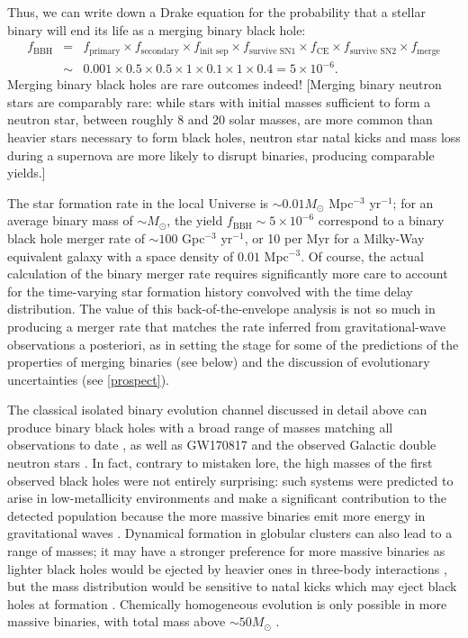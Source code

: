 \documentclass[iop,onecolumn]{revtex4}
\begin{document}
Thus, we can write down a Drake equation for the probability that a stellar binary will end its life as a merging binary black hole:
\begin{eqnarray}
f_\textrm{BBH} &=& f_\textrm{primary} \times f_\textrm{secondary} \times f_\textrm{init sep} \times f_\textrm{survive SN1} \times f_\textrm{CE} \times f_\textrm{survive SN2} \times f_\textrm{merge} \nonumber \\
 & \sim & 0.001 \times 0.5 \times 0.5 \times 1 \times 0.1 \times 1 \times 0.4 = 5 \times 10^{-6}.
\end{eqnarray}
Merging binary black holes are rare outcomes indeed!  [Merging binary neutron stars are comparably rare: while stars with initial masses sufficient to form a neutron star, between roughly 8 and 20 solar masses, are more common than heavier stars necessary to form black holes, neutron star natal kicks and mass loss during a supernova are more likely to disrupt binaries, producing comparable yields.]

The star formation rate in the local Universe is $\sim 0.01 M_\odot$ Mpc$^{-3}$ yr$^{-1}$; for an average binary mass of $\sim M_\odot$, the yield $f_\textrm{BBH} \sim 5 \times 10^{-6}$ correspond to a binary black hole merger rate of $\sim 100$ Gpc$^{-3}$ yr$^{-1}$, or 10 per Myr for a Milky-Way equivalent galaxy with a space density of $0.01$ Mpc$^{-3}$.  Of course, the actual calculation of the binary merger rate requires significantly more care to account for the time-varying star formation history convolved with the time delay distribution.  The value of this back-of-the-envelope analysis is not so much in producing a merger rate that matches the rate inferred from gravitational-wave observations a posteriori, as in setting the stage for some of the predictions of the properties of merging binaries (see below) and the discussion of evolutionary uncertainties (see \autoref{prospect}).

The classical isolated binary evolution channel discussed in detail above can produce binary black holes with a broad range of masses matching all observations to date \citep[e.g.,][]{Stevenson:2017}, as well as GW170817 and the observed Galactic double neutron stars \citep[e.g.,][]{Kruckow:2018,VignaGomez:2018}.  In fact, contrary to mistaken lore, the high masses of the first observed black holes were not entirely surprising: such systems were predicted to arise in low-metallicity environments and make a significant contribution to the detected population because the more massive binaries emit more energy in gravitational waves \citep{Dominik:2014}.  Dynamical formation in globular clusters can also lead to a range of masses; it may have a stronger preference for more massive binaries as lighter black holes would be ejected by heavier ones in three-body interactions \citep{Rodriguez:2015}, but the mass distribution would be sensitive to natal kicks which may eject black holes at formation \citep{Zevin:2017}.  Chemically homogeneous evolution is only possible in more massive binaries, with total mass above $\sim 50 M_\odot$ \citep{MandeldeMink:2016,Marchant:2016}.
\end{document}
